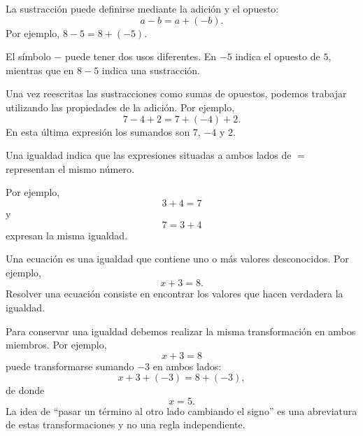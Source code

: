 \begin{tcolorbox}[resumen,title=Sustracción]
La sustracción puede definirse mediante la adición y el opuesto:
\[
a-b=a+(-b).
\]
Por ejemplo,
\(
8-5=8+(-5).
\)

El símbolo \(-\) puede tener dos usos diferentes. En \(-5\) indica el opuesto de \(5\), mientras que en \(8-5\) indica una sustracción.

Una vez reescritas las sustracciones como sumas de opuestos, podemos trabajar utilizando las propiedades de la adición. Por ejemplo,
\[
7-4+2
=
7+(-4)+2.
\]
En esta última expresión los sumandos son \(7\), \(-4\) y \(2\).
\end{tcolorbox}

\begin{tcolorbox}[resumen,title=Igualdades y ecuaciones]
Una igualdad indica que las expresiones situadas a ambos lados de \(=\) representan el mismo número.

Por ejemplo,
\[
3+4=7
\]
y
\[
7=3+4
\]
expresan la misma igualdad.

Una ecuación es una igualdad que contiene uno o más valores desconocidos. Por ejemplo,
\[
x+3=8.
\]
Resolver una ecuación consiste en encontrar los valores que hacen verdadera la igualdad.

Para conservar una igualdad debemos realizar la misma transformación en ambos miembros. Por ejemplo,
\[
x+3=8
\]
puede transformarse sumando \(-3\) en ambos lados:
\[
x+3+(-3)=8+(-3),
\]
de donde
\[
x=5.
\]
La idea de ``pasar un término al otro lado cambiando el signo'' es una abreviatura de estas transformaciones y no una regla independiente.
\end{tcolorbox}
